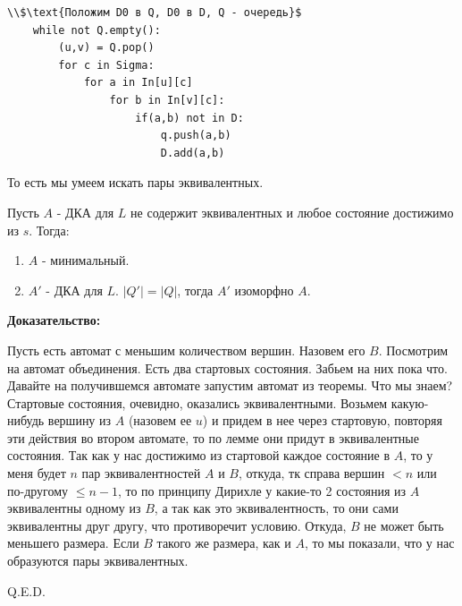 \begin{lstlisting}[mathescape]
    \\$\text{Положим D0 в Q, D0 в D, Q - очередь}$
    while not Q.empty():
        (u,v) = Q.pop()
        for c in Sigma:
            for a in In[u][c]
                for b in In[v][c]:
                    if(a,b) not in D:
                        q.push(a,b)
                        D.add(a,b)
\end{lstlisting}

То есть мы умеем искать пары эквивалентных.

 Пусть $A$ - ДКА для $L$ не содержит эквивалентных и любое состояние достижимо из $s$. Тогда:
\begin{enumerate}
    \item $A$ - минимальный.
    \item $A'$ - ДКА для $L$. $|Q'|=|Q|$, тогда $A'$ изоморфно $A$.
\end{enumerate}

\textbf{Доказательство:}

Пусть есть автомат с меньшим количеством вершин. Назовем его $B$. Посмотрим на автомат объединения. Есть два стартовых состояния. Забьем на них пока что. Давайте на получившемся автомате запустим автомат из теоремы. Что мы знаем? Стартовые состояния, очевидно, оказались эквивалентными. Возьмем какую-нибудь вершину из $A$ (назовем ее $u$) и придем в нее через стартовую, повторяя эти действия во втором автомате, то по лемме они придут в эквивалентные состояния. Так как у нас достижимо из стартовой каждое состояние в $A$, то у меня будет $n$ пар эквивалентностей $A$ и $B$, откуда, тк справа вершин $<n$ или по-другому $\leq n-1$, то по принципу Дирихле у какие-то 2 состояния из $A$ эквивалентны одному из $B$, а так как это эквивалентность, то они сами эквивалентны друг другу, что противоречит условию. Откуда, $B$ не может быть меньшего размера. Если $B$ такого же размера, как и $A$, то мы показали, что у нас образуются пары эквивалентных.

\hfill Q.E.D.


